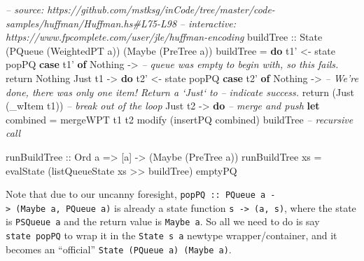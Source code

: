 \documentclass[]{article}
\newenvironment{Shaded}{}{}
\newcommand{\KeywordTok}[1]{\textcolor[rgb]{0.00,0.44,0.13}{\textbf{#1}}}
\newcommand{\DataTypeTok}[1]{\textcolor[rgb]{0.56,0.13,0.00}{#1}}
\newcommand{\CommentTok}[1]{\textcolor[rgb]{0.38,0.63,0.69}{\textit{#1}}}
\newcommand{\OtherTok}[1]{\textcolor[rgb]{0.00,0.44,0.13}{#1}}
\newcommand{\FunctionTok}[1]{\textcolor[rgb]{0.02,0.16,0.49}{#1}}
\newcommand{\NormalTok}[1]{#1}
\begin{document}
\begin{Shaded}
\begin{Highlighting}[]
\CommentTok{-- source: https://github.com/mstksg/inCode/tree/master/code-samples/huffman/Huffman.hs#L75-L98}
\CommentTok{-- interactive: https://www.fpcomplete.com/user/jle/huffman-encoding}
\OtherTok{buildTree ::} \DataTypeTok{State}\NormalTok{ (}\DataTypeTok{PQueue}\NormalTok{ (}\DataTypeTok{WeightedPT}\NormalTok{ a)) (}\DataTypeTok{Maybe}\NormalTok{ (}\DataTypeTok{PreTree}\NormalTok{ a))}
\NormalTok{buildTree }\FunctionTok{=} \KeywordTok{do}
\NormalTok{    t1' }\OtherTok{<-}\NormalTok{ state popPQ}
    \KeywordTok{case}\NormalTok{ t1' }\KeywordTok{of}
      \DataTypeTok{Nothing} \OtherTok{->}
        \CommentTok{-- queue was empty to begin with, so this fails.}
\NormalTok{        return }\DataTypeTok{Nothing}
      \DataTypeTok{Just}\NormalTok{ t1 }\OtherTok{->} \KeywordTok{do}
\NormalTok{        t2' }\OtherTok{<-}\NormalTok{ state popPQ}
        \KeywordTok{case}\NormalTok{ t2' }\KeywordTok{of}
          \DataTypeTok{Nothing}  \OtherTok{->}
            \CommentTok{-- We're done, there was only one item!  Return a `Just` to}
            \CommentTok{-- indicate success.}
\NormalTok{            return (}\DataTypeTok{Just}\NormalTok{ (_wItem t1))     }\CommentTok{-- break out of the loop}
          \DataTypeTok{Just}\NormalTok{ t2 }\OtherTok{->} \KeywordTok{do}
            \CommentTok{-- merge and push}
            \KeywordTok{let}\NormalTok{ combined }\FunctionTok{=}\NormalTok{ mergeWPT t1 t2}
\NormalTok{            modify (insertPQ combined)}
\NormalTok{            buildTree                     }\CommentTok{-- recursive call}

\OtherTok{runBuildTree ::} \DataTypeTok{Ord}\NormalTok{ a }\OtherTok{=>}\NormalTok{ [a] }\OtherTok{->}\NormalTok{ (}\DataTypeTok{Maybe}\NormalTok{ (}\DataTypeTok{PreTree}\NormalTok{ a))}
\NormalTok{runBuildTree xs }\FunctionTok{=}\NormalTok{ evalState (listQueueState xs }\FunctionTok{>>}\NormalTok{ buildTree) emptyPQ}
\end{Highlighting}
\end{Shaded}

Note that due to our uncanny foresight,
\texttt{popPQ\ ::\ PQueue\ a\ -\textgreater{}\ (Maybe\ a,\ PQueue\ a)} is
already a state function \texttt{s\ -\textgreater{}\ (a,\ s)}, where the state
is \texttt{PSQueue\ a} and the return value is \texttt{Maybe\ a}. So all we need
to do is say \texttt{state\ popPQ} to wrap it in the \texttt{State\ s\ a}
newtype wrapper/container, and it becomes an ``official''
\texttt{State\ (PQueue\ a)\ (Maybe\ a)}.
\end{document}
